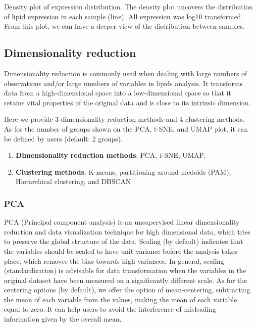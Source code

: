 \documentclass[]{article}
\providecommand{\tightlist}{%
  \setlength{\itemsep}{0pt}\setlength{\parskip}{0pt}}
\begin{document}
\label{fig:unnamed-chunk-5}Density plot of expression distribution. The density plot uncovers the distribution of lipid expression in each sample (line). All expression was log10 transformed. From this plot, we can have a deeper view of the distribution between samples.

\hypertarget{DimensionReduce}{%
\subsection{Dimensionality reduction}\label{DimensionReduce}}

Dimensionality reduction is commonly used when dealing with large numbers of observations and/or large numbers of variables in lipids analysis. It transforms data from a high-dimensional space into a low-dimensional space so that it retains vital properties of the original data and is close to its intrinsic dimension.

Here we provide 3 dimensionality reduction methods and 4 clustering methods. As for the number of groups shown on the PCA, t-SNE, and UMAP plot, it can be defined by users (default: 2 groups).

\begin{enumerate}
\def\labelenumi{\arabic{enumi}.}
\tightlist
\item
  \textbf{Dimensionality reduction methods}: PCA, t-SNE, UMAP.
\item
  \textbf{Clustering methods}: K-means, partitioning around medoids (PAM), Hierarchical clustering, and DBSCAN
\end{enumerate}

\hypertarget{PCA}{%
\subsubsection{PCA}\label{PCA}}

PCA (Principal component analysis) is an unsupervised linear dimensionality reduction and data visualization technique for high dimensional data, which tries to preserve the global structure of the data. Scaling (by default) indicates that the variables should be scaled to have unit variance before the analysis takes place, which removes the bias towards high variances. In general, scaling (standardization) is advisable for data transformation when the variables in the original dataset have been measured on a significantly different scale. As for the centering options (by default), we offer the option of mean-centering, subtracting the mean of each variable from the values, making the mean of each variable equal to zero. It can help users to avoid the interference of misleading information given by the overall mean.
\end{document}
